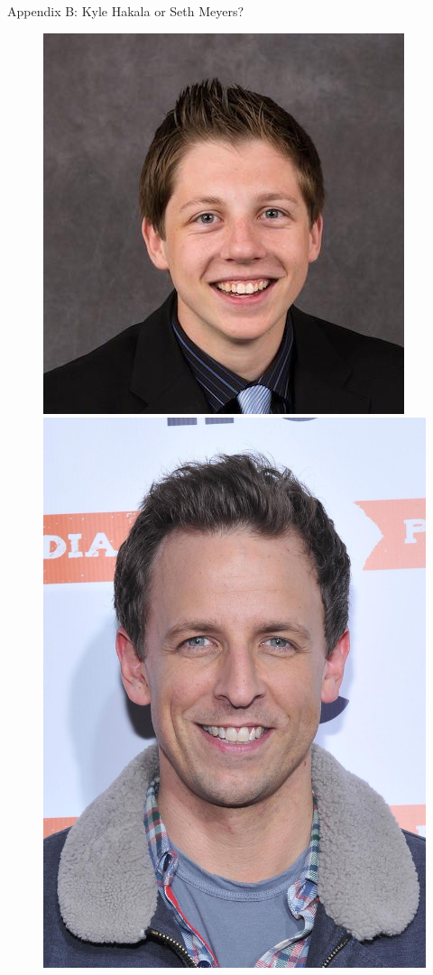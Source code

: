 \documentclass[xcolor=dvipsnames,aspectratio=1610]{beamer}
\begin{document}
\begin{frame}{Appendix B: Kyle Hakala or Seth Meyers?}
      \begin{figure}
      \centering
      \begin{minipage}{.5\textwidth}
        \centering
        \includegraphics[width=\linewidth]{kyle.png}
      \end{minipage}%
      \begin{minipage}{.5\textwidth}
        \centering
        \includegraphics[width=.8\linewidth]{seth.jpg}
      \end{minipage}
      \end{figure}


\end{frame}
\end{document}
